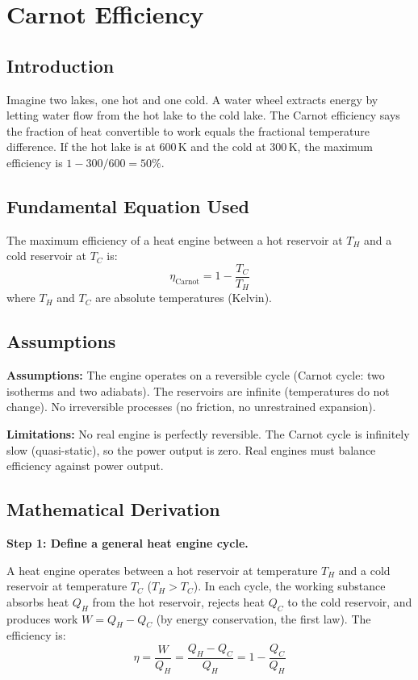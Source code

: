 \chapter{Carnot Efficiency}

\section*{Introduction}

Imagine two lakes, one hot and one cold. A water wheel extracts energy by letting water flow from the hot lake to the cold lake. The Carnot efficiency says the fraction of heat convertible to work equals the fractional temperature difference. If the hot lake is at 600\,K and the cold at 300\,K, the maximum efficiency is $1 - 300/600 = 50\%$.
\section*{Fundamental Equation Used}

The maximum efficiency of a heat engine between a hot reservoir at $T_H$ and a cold reservoir at $T_C$ is:
\[
\eta_{\text{Carnot}} = 1 - \frac{T_C}{T_H}
\]
where $T_H$ and $T_C$ are absolute temperatures (Kelvin).
\section*{Assumptions}

\textbf{Assumptions:} The engine operates on a reversible cycle (Carnot cycle: two isotherms and two adiabats). The reservoirs are infinite (temperatures do not change). No irreversible processes (no friction, no unrestrained expansion).


\textbf{Limitations:} No real engine is perfectly reversible. The Carnot cycle is infinitely slow (quasi-static), so the power output is zero. Real engines must balance efficiency against power output.


\section*{Mathematical Derivation}

\textbf{Step 1: Define a general heat engine cycle.}

A heat engine operates between a hot reservoir at temperature $T_H$ and a cold reservoir at temperature $T_C$ ($T_H > T_C$). In each cycle, the working substance absorbs heat $Q_H$ from the hot reservoir, rejects heat $Q_C$ to the cold reservoir, and produces work $W = Q_H - Q_C$ (by energy conservation, the first law). The efficiency is:
\begin{equation}
\eta = \frac{W}{Q_H} = \frac{Q_H - Q_C}{Q_H} = 1 - \frac{Q_C}{Q_H}
\end{equation}

